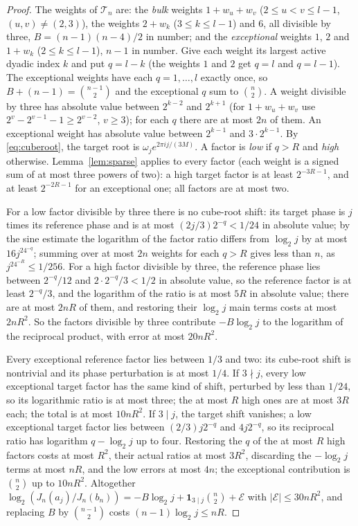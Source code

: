 \documentclass[11pt,a4paper]{article}
\theoremstyle{definition}
\begin{document}
\begin{proof}
The weights of $\mathcal T_n$ are: the \emph{bulk} weights $1+w_u+w_v$
($2\le u<v\le l-1$, $(u,v)\ne(2,3)$), the weights $2+w_k$ ($3\le k\le l-1$) and
$6$, all divisible by three, $B=(n-1)(n-4)/2$ in number; and the
\emph{exceptional} weights $1$, $2$ and $1+w_k$ ($2\le k\le l-1$), $n-1$ in
number. Give each weight its largest active dyadic index $k$ and put $q=l-k$
(the weights $1$ and $2$ get $q=l$ and $q=l-1$). The exceptional weights have
each $q=1,\dots,l$ exactly once, so $B+(n-1)=\binom{n-1}2$ and the exceptional
$q$ sum to $\binom n2$. A weight divisible by three has absolute value between
$2^{k-2}$ and $2^{k+1}$ (for $1+w_u+w_v$ use $2^v-2^{v-1}-1\ge2^{v-2}$, $v\ge3$);
for each $q$ there are at most $2n$ of them. An exceptional weight has absolute
value between $2^{k-1}$ and $3\cdot2^{k-1}$. By \eqref{eq:cuberoot}, the target
root is $\omega_je^{2\pi ij/(3M)}$. A factor is \emph{low} if $q>R$ and
\emph{high} otherwise. Lemma~\ref{lem:sparse} applies to every factor (each
weight is a signed sum of at most three powers of two): a high target factor is
at least $2^{-3R-1}$, and at least $2^{-2R-1}$ for an exceptional one; all
factors are at most two.

For a low factor divisible by three there is no cube-root shift: its target
phase is $j$ times its reference phase and is at most $(2j/3)2^{-q}<1/24$ in
absolute value; by the sine estimate the logarithm of the factor ratio differs
from $\log_2j$ by at most $16j^24^{-q}$; summing over at most $2n$ weights for
each $q>R$ gives less than $n$, as $j^24^{-R}\le1/256$. For a high factor
divisible by three, the reference phase lies between $2^{-q}/12$ and
$2\cdot2^{-q}/3<1/2$ in absolute value, so the reference factor is at least
$2^{-q}/3$, and the logarithm of the ratio is at most $5R$ in absolute value;
there are at most $2nR$ of them, and restoring their $\log_2j$ main terms costs
at most $2nR^2$. So the factors divisible by three contribute $-B\log_2j$ to the
logarithm of the reciprocal product, with error at most $20nR^2$.

Every exceptional reference factor lies between $1/3$ and two: its cube-root
shift is nontrivial and its phase perturbation is at most $1/4$. If $3\nmid j$,
every low exceptional target factor has the same kind of shift, perturbed by
less than $1/24$, so its logarithmic ratio is at most three; the at most $R$
high ones are at most $3R$ each; the total is at most $10nR^2$. If $3\mid j$,
the target shift vanishes; a low exceptional target factor lies between
$(2/3)j2^{-q}$ and $4j2^{-q}$, so its reciprocal ratio has logarithm $q-\log_2j$
up to four. Restoring the $q$ of the at most $R$ high factors costs at most
$R^2$, their actual ratios at most $3R^2$, discarding the $-\log_2j$ terms at
most $nR$, and the low errors at most $4n$; the exceptional contribution is
$\binom n2$ up to $10nR^2$. Altogether
$\log_2(J_n(a_j)/J_n(b_n))=-B\log_2j+\mathbf1_{3\mid j}\binom n2+\mathcal E$ with
$|\mathcal E|\le30nR^2$, and replacing $B$ by $\binom{n-1}2$ costs
$(n-1)\log_2j\le nR$.


\end{proof}
\end{document}
